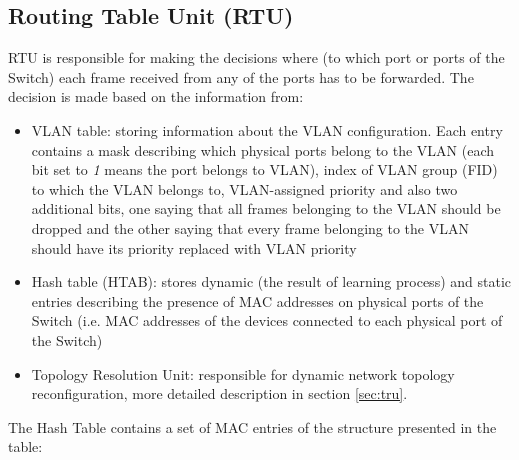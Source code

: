 \subsection{Routing Table Unit (RTU)}


RTU is responsible for making the decisions where (to which port or ports of the
Switch) each frame received from any of the ports has to be
forwarded. The decision is made based on the information from:
\begin{itemize}
  \item VLAN table: storing information about the VLAN configuration. Each entry
    contains a mask describing which physical ports belong to the VLAN (each bit
    set to \emph{1} means the port belongs to VLAN), index of VLAN group (FID)
    to which the VLAN belongs to, VLAN-assigned priority and also two additional
    bits, one saying that all frames belonging to the VLAN should be dropped and
    the other saying that every frame belonging to the VLAN should have its
    priority replaced with VLAN priority
  \item Hash table (HTAB): stores dynamic (the result of learning process) and
    static entries describing the presence of MAC addresses on physical ports of
    the Switch (i.e. MAC addresses of the devices connected to each physical
    port of the Switch)
  \item Topology Resolution Unit: responsible for dynamic network topology
    reconfiguration, more detailed description in section \ref{sec:tru}.
\end{itemize}

The Hash Table contains a set of MAC entries of the structure presented in the
table:\\

